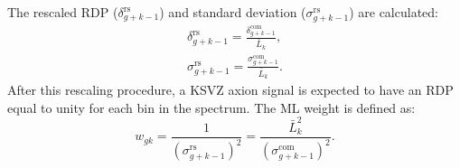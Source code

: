 The rescaled RDP ($\delta^\text{rs}_{g+k-1}$) and
standard deviation ($\sigma^\text{rs}_{g+k-1}$) are calculated:
\begin{equation}
  \label{eq:rescaled_delta_sigma_com}
  \begin{split}
  \delta^\text{rs}_{g+k-1} = \frac{\delta^\text{com}_{g+k-1}}{\bar{L}_{k}},\\
  \sigma^\text{rs}_{g+k-1} = \frac{\sigma^\text{com}_{g+k-1}}{\bar{L}_{k}}.
  \end{split}
\end{equation}
After this rescaling 
procedure, a KSVZ axion signal is expected to have an RDP equal to unity for 
each bin in the spectrum. 
%
%
%
%
The ML weight is defined as: 
\begin{equation}
    \label{eq:merge_weight}
    w_{gk} = \frac{1}{(\sigma_{g+k-1}^\text{rs})^{2}} = \frac{\bar{L}_{k}^{2}}{(\sigma_{g+k-1}^\text{com})^{2}}.
\end{equation}
